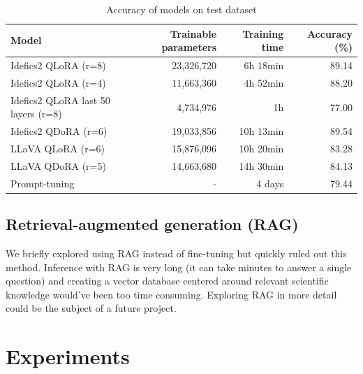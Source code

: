 \documentclass{article}
\begin{document}
\begin{table}[t]
  \centering
  \begin{tabular}{lrrr}
    \hline
    Model & Trainable parameters & Training time & Accuracy (\%)\\ 
    \hline
    Idefics2 QLoRA (r=8) & 23,326,720 & 6h 18min & 89.14\\ 
    Idefics2 QLoRA (r=4) & 11,663,360 & 4h 52min & 88.20\\ 
    Idefics2 QLoRA last 50 layers (r=8) & 4,734,976 & 1h & 77.00\\
    Idefics2 QDoRA (r=6) & 19,033,856 & 10h 13min & 89.54\\
    LLaVA QLoRA (r=6) & 15,876,096 & 10h 20min & 83.28\\
    LLaVA QDoRA (r=5) & 14,663,680 & 14h 30min & 84.13\\
    Prompt-tuning & - & 4 days & 79.44\\
    \hline
  \end{tabular}
  \caption{Accuracy of models on test dataset}
  \label{tab:model_performance}
\end{table}

\subsection{Retrieval-augmented generation (RAG)}
We briefly explored using RAG instead of fine-tuning but quickly ruled out this method. Inference with RAG is very long (it can take minutes to answer a single question) and creating a vector database centered around relevant scientific knowledge would've been too time consuming. Exploring RAG in more detail could be the subject of a future project.

\section{Experiments}
\label{sec:experiments}
\end{document}

